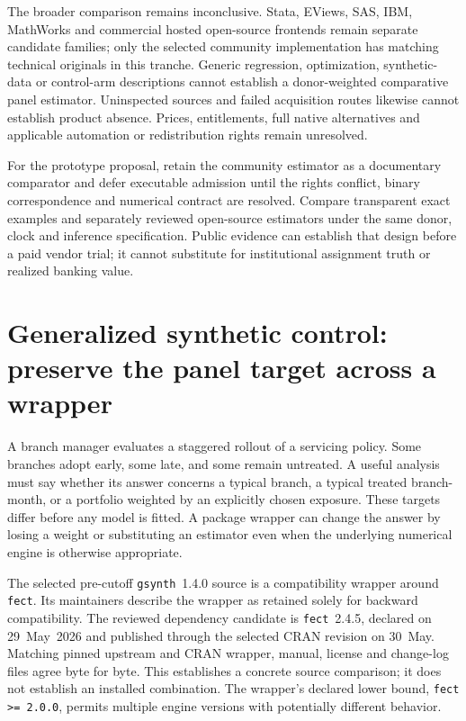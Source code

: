 The broader comparison remains inconclusive. Stata, EViews, SAS, IBM,
MathWorks and commercial hosted open-source frontends remain separate candidate
families; only the selected community implementation has matching technical
originals in this tranche. Generic regression, optimization, synthetic-data or
control-arm descriptions cannot establish a donor-weighted comparative panel
estimator. Uninspected sources and failed acquisition routes likewise cannot
establish product absence. Prices, entitlements, full native alternatives and
applicable automation or redistribution rights remain unresolved.

For the prototype proposal, retain the community estimator as a documentary
comparator and defer executable admission until the rights conflict, binary
correspondence and numerical contract are resolved. Compare transparent exact
examples and separately reviewed open-source estimators under the same donor,
clock and inference specification. Public evidence can establish that design
before a paid vendor trial; it cannot substitute for institutional assignment
truth or realized banking value.


\section{Generalized synthetic control: preserve the panel target across a wrapper}
\label{exec21:gsynth-scope}

A branch manager evaluates a staggered rollout of a servicing policy. Some
branches adopt early, some late, and some remain untreated. A useful analysis
must say whether its answer concerns a typical branch, a typical treated
branch-month, or a portfolio weighted by an explicitly chosen exposure.
These targets differ before any model is fitted. A package wrapper can change
the answer by losing a weight or substituting an estimator even when the
underlying numerical engine is otherwise appropriate.

The selected pre-cutoff \texttt{gsynth}~1.4.0 source is a compatibility
wrapper around \texttt{fect}. Its maintainers describe the wrapper as retained
solely for backward compatibility. The reviewed dependency candidate is
\texttt{fect}~2.4.5, declared on 29~May~2026 and published through the selected
CRAN revision on 30~May. Matching pinned upstream and CRAN wrapper, manual,
license and change-log files agree byte for byte. This establishes a concrete
source comparison; it does not establish an installed combination. The
wrapper's declared lower bound, \texttt{fect >= 2.0.0}, permits multiple engine
versions with potentially different behavior. \cite{exec21_gsynth_wrapper,exec21_gsynth_engine}

